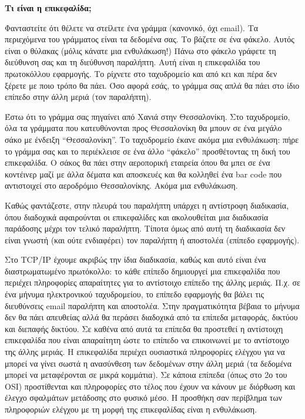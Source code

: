 \begin{inthebox}
\textbf{Τι είναι η επικεφαλίδα;}

Φανταστείτε ότι θέλετε να στείλετε ένα γράμμα (κανονικό, όχι email). Τα περιεχόμενα του γράμματος είναι τα δεδομένα σας. Το βάζετε σε ένα φάκελο. Αυτός είναι ο θύλακας (μόλις κάνατε μια ενθυλάκωση!) Πάνω στο φάκελο γράφετε τη διεύθυνση σας και τη διεύθυνση παραλήπτη. Αυτή είναι η επικεφαλίδα του πρωτοκόλλου εφαρμογής. Το ρίχνετε στο ταχυδρομείο και από κει και πέρα δεν ξέρετε με ποιο τρόπο θα πάει. Όσο αφορά εσάς, το γράμμα σας απλά θα πάει στο ίδιο επίπεδο στην άλλη μεριά (τον παραλήπτη).

Έστω ότι το γράμμα σας πηγαίνει από Χανιά στην Θεσσαλονίκη. Στο ταχυδρομείο, όλα τα γράμματα που κατευθύνονται προς Θεσσαλονίκη θα μπουν σε ένα μεγάλο σάκο με ένδειξη ``Θεσσαλονίκη''. Το ταχυδρομείο έκανε ακόμα μια ενθυλάκωση: πήρε το γράμμα σας και το περιέκλεισε σε ένα άλλο ``φάκελο'' προσθέτοντας τη δική του επικεφαλίδα. Ο σάκος θα πάει στην αεροπορική εταιρεία όπου θα μπει σε ένα κοντέινερ μαζί με άλλα δέματα και αποσκευές και θα κολληθεί ένα bar code που αντιστοιχεί στο αεροδρόμιο Θεσσαλονίκης. Ακόμα μια ενθυλάκωση.

Καθώς φαντάζεστε, στην πλευρά του παραλήπτη υπάρχει η αντίστροφη διαδικασία, όπου διαδοχικά αφαιρούνται οι επικεφαλίδες και ακολουθείται μια διαδικασία παράδοσης μέχρι τον τελικό παραλήπτη. Τίποτα όμως από αυτή τη διαδικασία δεν είναι γνωστή (και ούτε ενδιαφέρει) τον παραλήπτη ή αποστολέα (επίπεδο εφαρμογής).\\
\end{inthebox}

Στο TCP/IP έχουμε ακριβώς την ίδια διαδικασία, καθώς και αυτό είναι ένα διαστρωματωμένο πρωτόκολλο: το κάθε επίπεδο δημιουργεί μια επικεφαλίδα που περιέχει πληροφορίες απαραίτητες για το αντίστοιχο επίπεδο της άλλης μεριάς. Π.χ. σε ένα μήνυμα ηλεκτρονικού ταχυδρομείου, το επίπεδο εφαρμογής θα βάλει τις διευθύνσεις email παραλήπτη και αποστολέα. Στην πραγματικότητα βέβαια το μήνυμα δεν θα πάει απευθείας αλλά θα περάσει διαδοχικά από τα επίπεδα μεταφοράς, δικτύου και διεπαφής δικτύου. Σε καθένα από αυτά τα επίπεδα θα προστεθεί η αντίστοιχη επικεφαλίδα που είναι απαραίτητη ώστε το επίπεδο να επικοινωνεί με το αντίστοιχο της άλλης μεριάς. Η επικεφαλίδα περιέχει ουσιαστικά πληροφορίες ελέγχου για να μπορεί να γίνει σωστά η ανασύνθεση των δεδομένων στην άλλη μεριά (τα δεδομένα μπορεί να μεταφέρονται σε μικρά κομμάτια). Σε κάποια επίπεδα (όπως στο 2ο του OSI) προστίθενται και πληροφορίες στο τέλος που έχουν να κάνουν με διόρθωση και έλεγχο σφαλμάτων μετάδοσης στο φυσικό μέσο. Η προσθήκη σαν περίβλημα των πληροφοριών ελέγχου με τη μορφή της επικεφαλίδας είναι η ενθυλάκωση.

